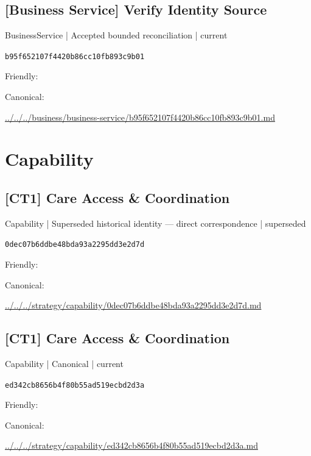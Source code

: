 \documentclass[10pt,a4paper]{article}
\begin{document}
\subsection*{[Business Service] Verify Identity Source}
{\small BusinessService | Accepted bounded reconciliation | current}\par
\texttt{b95f652107f4420b86cc10fb893c9b01}\par
Friendly: \par
Canonical: \par
{\footnotesize\url{../../../business/business-service/b95f652107f4420b86cc10fb893c9b01.md}}\par
\section*{Capability}
\subsection*{[CT1] Care Access \& Coordination}
{\small Capability | Superseded historical identity — direct correspondence | superseded}\par
\texttt{0dec07b6ddbe48bda93a2295dd3e2d7d}\par
Friendly: \par
Canonical: \par
{\footnotesize\url{../../../strategy/capability/0dec07b6ddbe48bda93a2295dd3e2d7d.md}}\par
\subsection*{[CT1] Care Access \& Coordination}
{\small Capability | Canonical | current}\par
\texttt{ed342cb8656b4f80b55ad519ecbd2d3a}\par
Friendly: \par
Canonical: \par
{\footnotesize\url{../../../strategy/capability/ed342cb8656b4f80b55ad519ecbd2d3a.md}}\par
\end{document}
